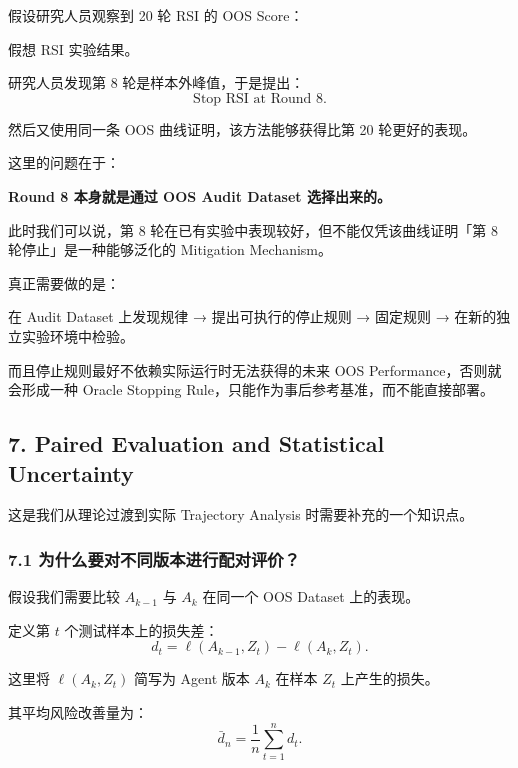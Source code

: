 假设研究人员观察到 20 轮 RSI 的 OOS Score：


假想 RSI 实验结果。

研究人员发现第 8 轮是样本外峰值，于是提出：
\[\text{Stop RSI at Round 8}.\]

然后又使用同一条 OOS 曲线证明，该方法能够获得比第 20 轮更好的表现。

这里的问题在于：

\textbf{Round 8 本身就是通过 OOS Audit Dataset 选择出来的。}

此时我们可以说，第 8 轮在已有实验中表现较好，但不能仅凭该曲线证明「第 8 轮停止」是一种能够泛化的 Mitigation Mechanism。

真正需要做的是：

在 Audit Dataset 上发现规律 → 提出可执行的停止规则 → 固定规则 → 在新的独立实验环境中检验。

而且停止规则最好不依赖实际运行时无法获得的未来 OOS Performance，否则就会形成一种 Oracle Stopping Rule，只能作为事后参考基准，而不能直接部署。

\hypertarget{part-2-27-0001-paired-evaluation-and-statistical-uncertainty}{%
\subsection{7. Paired Evaluation and Statistical Uncertainty}\label{part-2-27-0001-paired-evaluation-and-statistical-uncertainty}}

这是我们从理论过渡到实际 Trajectory Analysis 时需要补充的一个知识点。

\hypertarget{part-2-27-0001-ux4e3aux4ec0ux4e48ux8981ux5bf9ux4e0dux540cux7248ux672cux8fdbux884cux914dux5bf9ux8bc4ux4ef7}{%
\subsubsection{7.1 为什么要对不同版本进行配对评价？}\label{part-2-27-0001-ux4e3aux4ec0ux4e48ux8981ux5bf9ux4e0dux540cux7248ux672cux8fdbux884cux914dux5bf9ux8bc4ux4ef7}}

假设我们需要比较 \(A_{k-1}\) 与 \(A_k\) 在同一个 OOS Dataset 上的表现。

定义第 \(t\) 个测试样本上的损失差：
\[d_t=
\ell(A_{k-1},Z_t)-\ell(A_k,Z_t).\]

这里将 \(\ell(A_k,Z_t)\) 简写为 Agent 版本 \(A_k\) 在样本 \(Z_t\) 上产生的损失。

其平均风险改善量为：
\[\bar d_n=\frac1n\sum_{t=1}^n d_t.\]

